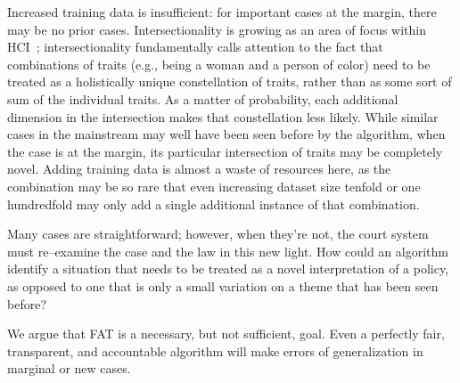 \documentclass[street-level_algorithms]{subfiles}
\begin{document}
Increased training data is insufficient: for important cases at the margin,
there may be no prior cases.
Intersectionality is growing as an area of focus within HCI~\cite{schlesinger2017intersectional};
intersectionality fundamentally calls attention to the fact that combinations of traits
(e.g., being a woman and a person of color)
need to be treated as a holistically unique constellation of traits, rather than
as some sort of sum of the individual traits.
As a matter of probability,
each additional dimension in the intersection makes that constellation less likely.
While similar cases in the mainstream may well have been seen before by the algorithm,
when the case is at the margin,
its particular intersection of traits may be completely novel.
Adding training data is almost a waste of resources here, as
the combination may be so rare that even
increasing dataset size tenfold or one hundredfold
may only add a single additional instance of that combination.

Many cases are straightforward; however, when they're not,
the court system must re--examine the case and the law in this new light.
How could an algorithm identify a situation that needs to be treated as
a novel interpretation of a policy, as opposed to
one that is only a small variation on a theme that has been seen before?

We argue that FAT is a necessary, but not sufficient, goal.
Even a perfectly fair, transparent, and accountable algorithm
will make errors of generalization in marginal or new cases.

\onlyinsubfile{
  
  
}
\end{document}
